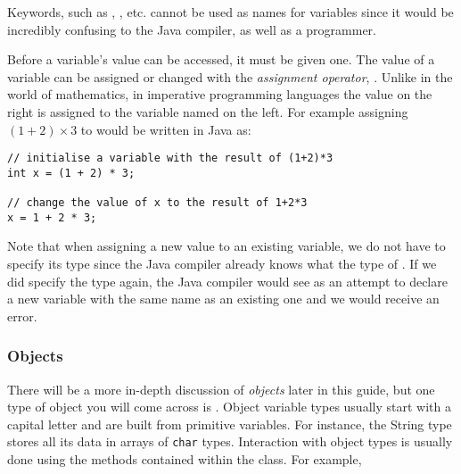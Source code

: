 Keywords, such as , , etc. cannot be used as names for variables since it would be incredibly confusing to the Java compiler, as well as a programmer. 

Before a variable's value can be accessed, it must be given one. The value of a variable can be assigned or changed with the \emph{assignment operator}, \javaIn{=}. Unlike in the world of mathematics, in imperative programming languages the value on the right is assigned to the variable named on the left. For example assigning $(1 + 2) \times 3$ to  would be written in Java as: 

\begin{verbatim}
// initialise a variable with the result of (1+2)*3
int x = (1 + 2) * 3;

// change the value of x to the result of 1+2*3
x = 1 + 2 * 3;
\end{verbatim}
Note that when assigning a new value to an existing variable, we do not have to specify its type since the Java compiler already knows what the type of . If we did specify the type again, the Java compiler would see as an attempt to declare a new variable with the same name as an existing one and we would receive an error.

\taskLine 

	
\taskLine 
	

\taskLine 


\taskLine 

\subsubsection{Objects}

There will be a more in-depth discussion of \emph{objects} later in this guide, but one type of object you will come across is . Object variable types usually start with a capital letter and are built from primitive variables. For instance, the String type stores all its data in arrays of {\tt char} types. Interaction with object types is usually done using the methods contained within the class. For example,

